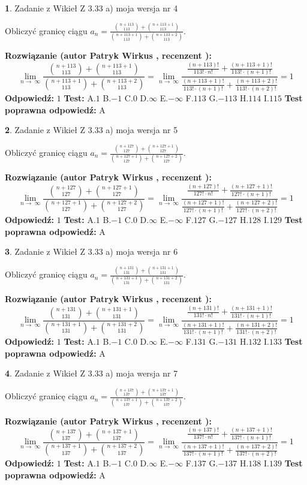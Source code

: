 \documentclass[12pt, a4paper]{article}
\theoremstyle{definition} %
\newtheorem{zad}{}
\newcommand{\zadStart}[1]{\begin{zad}#1\newline}
\newcommand{\zadStop}{\end{zad}}
\newcommand{\rozwStart}[2]{\noindent \textbf{Rozwiązanie (autor #1 , recenzent #2): }\newline}
\newcommand{\rozwStop}{\newline}
\newcommand{\odpStart}{\noindent \textbf{Odpowiedź:}\newline}
\newcommand{\odpStop}{\newline}
\newcommand{\testStart}{\noindent \textbf{Test:}\newline}
\newcommand{\testStop}{\newline}
\newcommand{\kluczStart}{\noindent \textbf{Test poprawna odpowiedź:}\newline}
\newcommand{\kluczStop}{\newline}
\begin{document}
\zadStart{Zadanie z Wikieł Z 3.33 a) moja wersja nr 4}

Obliczyć granicę ciągu $a_{n}=\frac{{n+113\choose113}+{n+113+1\choose113}}{{n+113+1\choose113}+{n+113+2\choose113}}$.
\zadStop
\rozwStart{Patryk Wirkus}{}
$$\lim\limits_{n\to\ \infty}\frac{{n+113\choose113}+{n+113+1\choose113}}{{n+113+1\choose113}+{n+113+2\choose113}} = \lim\limits_{n\to\ \infty}\frac{\frac{(n+113)!}{113! \cdot n!}+\frac{(n+113+1)!}{113! \cdot (n+1)!}}{\frac{(n+113+1)!}{113! \cdot (n+1)!}+\frac{(n+113+2)!}{113! \cdot (n+2)!}} = 1$$
\rozwStop
\odpStart
$1$
\odpStop
\testStart
A.$1$ B.$-1$ C.$0$ D.$\infty$ E.$-\infty$
F.$113$ G.$-113$
H.$114$
I.$115$
\testStop
\kluczStart
A
\kluczStop



\zadStart{Zadanie z Wikieł Z 3.33 a) moja wersja nr 5}

Obliczyć granicę ciągu $a_{n}=\frac{{n+127\choose127}+{n+127+1\choose127}}{{n+127+1\choose127}+{n+127+2\choose127}}$.
\zadStop
\rozwStart{Patryk Wirkus}{}
$$\lim\limits_{n\to\ \infty}\frac{{n+127\choose127}+{n+127+1\choose127}}{{n+127+1\choose127}+{n+127+2\choose127}} = \lim\limits_{n\to\ \infty}\frac{\frac{(n+127)!}{127! \cdot n!}+\frac{(n+127+1)!}{127! \cdot (n+1)!}}{\frac{(n+127+1)!}{127! \cdot (n+1)!}+\frac{(n+127+2)!}{127! \cdot (n+2)!}} = 1$$
\rozwStop
\odpStart
$1$
\odpStop
\testStart
A.$1$ B.$-1$ C.$0$ D.$\infty$ E.$-\infty$
F.$127$ G.$-127$
H.$128$
I.$129$
\testStop
\kluczStart
A
\kluczStop



\zadStart{Zadanie z Wikieł Z 3.33 a) moja wersja nr 6}

Obliczyć granicę ciągu $a_{n}=\frac{{n+131\choose131}+{n+131+1\choose131}}{{n+131+1\choose131}+{n+131+2\choose131}}$.
\zadStop
\rozwStart{Patryk Wirkus}{}
$$\lim\limits_{n\to\ \infty}\frac{{n+131\choose131}+{n+131+1\choose131}}{{n+131+1\choose131}+{n+131+2\choose131}} = \lim\limits_{n\to\ \infty}\frac{\frac{(n+131)!}{131! \cdot n!}+\frac{(n+131+1)!}{131! \cdot (n+1)!}}{\frac{(n+131+1)!}{131! \cdot (n+1)!}+\frac{(n+131+2)!}{131! \cdot (n+2)!}} = 1$$
\rozwStop
\odpStart
$1$
\odpStop
\testStart
A.$1$ B.$-1$ C.$0$ D.$\infty$ E.$-\infty$
F.$131$ G.$-131$
H.$132$
I.$133$
\testStop
\kluczStart
A
\kluczStop



\zadStart{Zadanie z Wikieł Z 3.33 a) moja wersja nr 7}

Obliczyć granicę ciągu $a_{n}=\frac{{n+137\choose137}+{n+137+1\choose137}}{{n+137+1\choose137}+{n+137+2\choose137}}$.
\zadStop
\rozwStart{Patryk Wirkus}{}
$$\lim\limits_{n\to\ \infty}\frac{{n+137\choose137}+{n+137+1\choose137}}{{n+137+1\choose137}+{n+137+2\choose137}} = \lim\limits_{n\to\ \infty}\frac{\frac{(n+137)!}{137! \cdot n!}+\frac{(n+137+1)!}{137! \cdot (n+1)!}}{\frac{(n+137+1)!}{137! \cdot (n+1)!}+\frac{(n+137+2)!}{137! \cdot (n+2)!}} = 1$$
\rozwStop
\odpStart
$1$
\odpStop
\testStart
A.$1$ B.$-1$ C.$0$ D.$\infty$ E.$-\infty$
F.$137$ G.$-137$
H.$138$
I.$139$
\testStop
\kluczStart
A
\kluczStop
\end{document}
